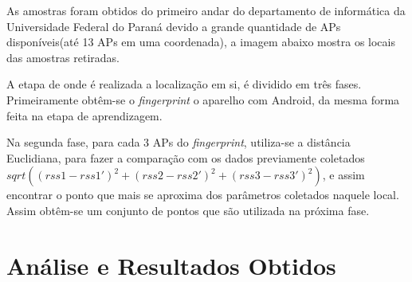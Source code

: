   As amostras foram obtidos do primeiro andar do departamento de informática da Universidade Federal do Paraná devido a 
  grande quantidade de APs disponíveis(até 13 APs em uma coordenada), a imagem abaixo mostra os locais das amostras retiradas.
  
  A etapa de onde é realizada a localização em si, é dividido em três fases. Primeiramente obtêm-se o \textit{fingerprint}
  o aparelho com Android, da mesma forma feita na etapa de aprendizagem. 
  
  Na segunda fase, para cada 3 APs do \textit{fingerprint}, utiliza-se a distância Euclidiana, para fazer a comparação com os 
  dados previamente coletados $sqrt((rss1-rss1')^{2}+(rss2-rss2')^{2}+(rss3-rss3')^{2})$, 
e assim encontrar o ponto que mais se aproxima dos parâmetros coletados naquele local. 
Assim obtêm-se um conjunto de pontos que são utilizada na próxima fase.

  
  \begin{comment}
  -Criação da tabela:
    -para a coordenada em questão são obtidas 8 amostras da força do sinal wifi, e é feita a 
    média de cada força de sinal wifi de cada AP.
	- Pois O RSS varia muito(exibir exemplo).
  -Calculo da posição(3 fases):
    - Permite obter a posição do aparelho mesmo sem um fingerprint da posição do aparelho.
	- com as triangulações obtem-se o pontos que se aproxima da posição real.
    -obtem se 8 amostras do APs wifis e faz-se média.
    - para cada 3 APs obtem-se um ponto do mapa.
	- Esse ponto é obtido calculando a menor distância euclidiana entre os APs na amostragem e 
	e os dados salvos na tabela.
    - Com o esse conjunto de pontos, calcula-se o mmq com a biblioteca do apache(citar).
      -Onde obtem se o melhor ponto que resume os pontos obtidos.
    -Colocar imagem.
    \end{comment}
\section{Análise e Resultados Obtidos}

